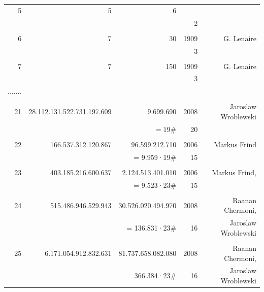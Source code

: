 \begin{refsegment}
\begin{itemize}
\begin{table}[ht]
\begin{center}
\begin{tabular}{|r|r|r|r|r|}
      5 &                   5 &                   6 &      & \\
        &                     &                     &    2 & \\
	&&&& \\

      6 &                   7 &                  30 & 1909 & G. Lenaire \\
        &                     &                     &    3 & \\
	&&&& \\

      7 &                   7 &                 150 & 1909 & G. Lenaire \\
        &                     &                     &    3 & \\

....... &                     &                     &      & \\
	&&&& \\

     21 & 28.112.131.522.731.197.609 &          9.699.690 & 2008 & Jaroslaw Wroblewski\\
        &                            &              $= 19\#$ &   20 & \\
	&&&& \\

     22 &        166.537.312.120.867 &     96.599.212.710 & 2006 & Markus Frind\\
        &                            &        = 9.959·19\# &   15 & \\
	&&&& \\

     23 &        403.185.216.600.637 &  2.124.513.401.010 & 2006 & Markus Frind,\\
        &                            &        = 9.523·23\# &   15 & \\
	&&&& \\

     24 &        515.486.946.529.943 & 30.526.020.494.970 & 2008 & Raanan Chermoni,\\
        &                            &      = 136.831·23\# &   16 & Jaroslaw Wroblewski\\
	&&&& \\

     25 &      6.171.054.912.832.631 & 81.737.658.082.080 & 2008 & Raanan Chermoni,\\
        &                            &      = 366.384·23\# &   16 & Jaroslaw Wroblewski\\


\end{tabular}
\end{center}
\end{table}
\end{itemize}
\end{refsegment}
